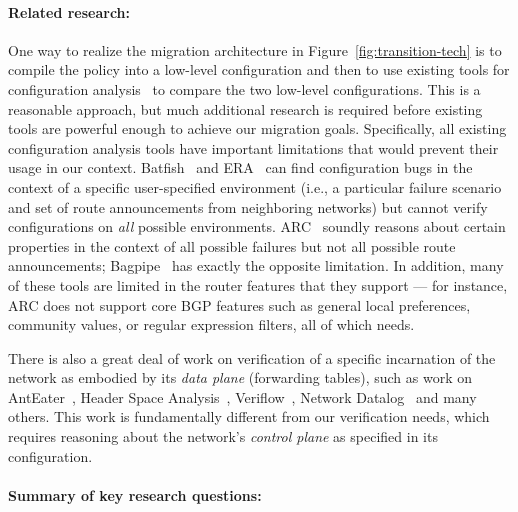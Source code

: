 \paragraph*{Related research:}  
One way to realize the migration architecture in Figure~\ref{fig:transition-tech} is to compile the \Name policy into a low-level configuration
and then to use existing tools for configuration analysis~\cite{batfish,arc,bagpipe,era} to compare the two low-level configurations.  This is a reasonable approach, but much additional research is required before existing
tools are powerful enough to achieve our migration goals.  Specifically, all existing configuration analysis tools have important limitations that would prevent their usage in our context.  Batfish~\cite{batfish} and ERA~\cite{era} can find configuration bugs in the context of a specific user-specified environment (i.e., a particular failure scenario and set of route announcements from neighboring networks) but cannot verify configurations on \emph{all} possible environments.  ARC~\cite{arc} soundly reasons about certain properties in the context of all possible failures but not all possible route announcements; Bagpipe~\cite{bagpipe} has exactly the opposite limitation.  In addition, many of these tools are limited in the router
features that they support --- for instance, ARC does not support core BGP features such as
general local preferences, community values, or regular expression filters, all of which
\Name needs.

There is also a great deal of work on verification of a specific incarnation of the network as embodied by its \emph{data plane} (forwarding tables), such as work on AntEater~\cite{mai+:anteater}, Header Space Analysis~\cite{hsa},
Veriflow~\cite{khurshid13veriflow}, Network Datalog~\cite{nod} and many others.  This work is fundamentally different from our
verification needs, which requires reasoning about the network's \emph{control plane} as specified in its configuration.

\paragraph*{Summary of key research questions:}

